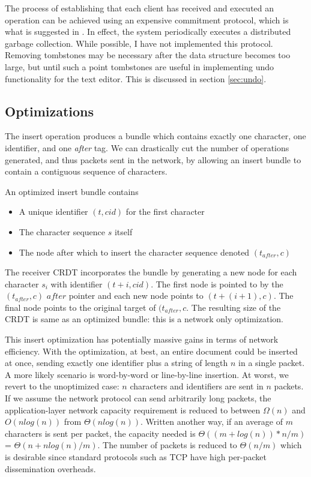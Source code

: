 \documentclass[12pt,a4paper,twoside,openright]{report}
\begin{document}
			The process of establishing that each client has received and executed an operation can be achieved using an expensive commitment protocol, which is what is suggested in \cite{preguica2009}. In effect, the system periodically executes a distributed garbage collection. While possible, I have not implemented this protocol. Removing tombstones may be necessary after the data structure becomes too large, but until such a point tombstones are useful in implementing undo functionality for the text editor. This is discussed in section \cref{sec:undo}.
			
		
		\subsection{Optimizations}
			The insert operation produces a bundle which contains exactly one character, one identifier, and one \textit{after} tag. We can drastically cut the number of operations generated, and thus packets sent in the network, by allowing an insert bundle to contain a contiguous sequence of characters. 
			
			An optimized insert bundle contains
			\begin{itemize}
				\item A unique identifier  $(t, cid)$ for the first character
				\item The character sequence $s$ itself
				\item The node after which to insert the character sequence denoted $(t_{after}, c)$
			\end{itemize}
			The receiver CRDT incorporates the bundle by generating a new node for each character $s_i$ with identifier $(t + i, cid)$. The first node is pointed to by the $(t_{after}, c)$ $after$ pointer and each new node points to $(t + (i+1), c)$. The final node points to the original target of $(t_{after}, c$. The resulting size of the CRDT is same as an optimized bundle: this is a network only optimization.
			
			This insert optimization has potentially massive gains in terms of network efficiency. With the optimization, at best, an entire document could be inserted at once, sending exactly one identifier plus a string of length $n$ in a single packet. A more likely scenario is word-by-word or line-by-line insertion. At worst, we revert to the unoptimized case: $n$ characters and identifiers are sent in $n$ packets. If we assume the network protocol can send arbitrarily long packets, the application-layer network capacity requirement is reduced to between $\Omega (n)$ and $O(nlog(n))$ from $\Theta(nlog(n))$. Written another way, if an average of $m$ characters is sent per packet, the capacity needed is $\Theta ((m+log(n)) * n/m)$ = $\Theta (n + nlog(n)/m)$. The number of packets is reduced to $\Theta (n/m)$ which is desirable since standard protocols such as TCP have high per-packet dissemination overheads.
			
\end{document}
